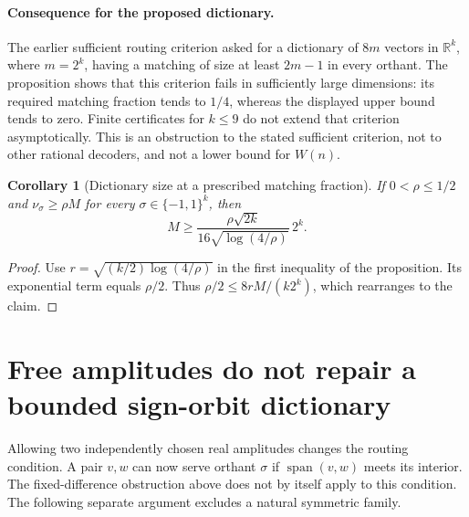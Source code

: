 \documentclass[11pt]{article}
\newtheorem{corollary}[proposition]{Corollary}
\begin{document}
\paragraph{Consequence for the proposed dictionary.}
The earlier sufficient routing criterion asked for a dictionary
of $8m$ vectors in $\mathbb R^k$, where $m=2^k$, having a
matching of size at least $2m-1$ in every orthant. The proposition
shows that this criterion fails in sufficiently large dimensions:
its required matching fraction tends to $1/4$, whereas the
displayed upper bound tends to zero. Finite certificates for
$k\leq9$ do not extend that criterion asymptotically. This is an
obstruction to the stated sufficient criterion, not to other
rational decoders, and not a lower bound for $W(n)$.

\begin{corollary}[Dictionary size at a prescribed matching fraction]
If $0<\rho\leq1/2$ and $\nu_\sigma\geq\rho M$ for every
$\sigma\in\{-1,1\}^k$, then
\[
 M\geq \frac{\rho\sqrt{2k}}{16\sqrt{\log(4/\rho)}}\,2^k.
\]
\end{corollary}
\begin{proof}
Use $r=\sqrt{(k/2)\log(4/\rho)}$ in the first inequality of
the proposition. Its exponential term equals $\rho/2$.
Thus $\rho/2\leq8rM/(k2^k)$, which rearranges to the claim.
\end{proof}

\section{Free amplitudes do not repair a bounded sign-orbit dictionary}

Allowing two independently chosen real amplitudes changes the routing
condition. A pair $v,w$ can now serve orthant $\sigma$ if
$\operatorname{span}(v,w)$ meets its interior. The fixed-difference
obstruction above does not by itself apply to this condition.
The following separate argument excludes a natural symmetric family.
\end{document}
